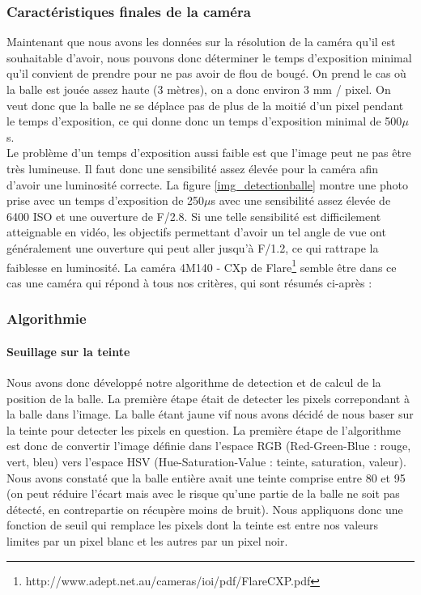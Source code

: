\subsubsection{Caractéristiques finales de la caméra}

Maintenant que nous avons les données sur la résolution de la caméra qu'il est souhaitable d'avoir, nous pouvons donc déterminer le temps d'exposition minimal qu'il convient de prendre pour ne pas avoir de flou de bougé. On prend le cas où la balle est jouée assez haute (3 mètres), on a donc environ 3 mm / pixel. On veut donc que la balle ne se déplace pas de plus de la moitié d'un pixel pendant le temps d'exposition, ce qui donne donc un temps d'exposition minimal de 500$\mu$s. \\

Le problème d'un temps d'exposition aussi faible est que l'image peut ne pas être très lumineuse. Il faut donc une sensibilité assez élevée pour la caméra afin d'avoir une luminosité correcte. La figure \ref{img_detectionballe} montre une photo prise avec un temps d'exposition de 250$\mu$s avec une sensibilité assez élevée de 6400 ISO et une ouverture de F/2.8. Si une telle sensibilité est difficilement atteignable en vidéo, les objectifs permettant d'avoir un tel angle de vue ont généralement une ouverture qui peut aller jusqu'à F/1.2, ce qui rattrape la faiblesse en luminosité. La caméra 4M140 - CXp de Flare\footnote{http://www.adept.net.au/cameras/ioi/pdf/FlareCXP.pdf} semble être dans ce cas une caméra qui répond à tous nos critères, qui sont résumés ci-après : 





\subsubsection{Algorithmie}

\paragraph{Seuillage sur la teinte\\}

Nous avons donc développé notre algorithme de detection et de calcul de la position de la balle. La première étape était de detecter les pixels correpondant à la balle dans l'image. La balle étant jaune vif nous avons décidé de nous baser sur la teinte pour detecter les pixels en question. La première étape de l'algorithme est donc de convertir l'image définie dans l'espace RGB (Red-Green-Blue : rouge, vert, bleu) vers l'espace HSV (Hue-Saturation-Value : teinte, saturation, valeur). Nous avons constaté que la balle entière avait une teinte comprise entre 80 et 95 (on peut réduire l'écart mais avec le risque qu'une partie de la balle ne soit pas détecté, en contrepartie on récupère moins de bruit). Nous appliquons donc une fonction de seuil qui remplace les pixels dont la teinte est entre nos valeurs limites par un pixel blanc et les autres par un pixel noir.\\

